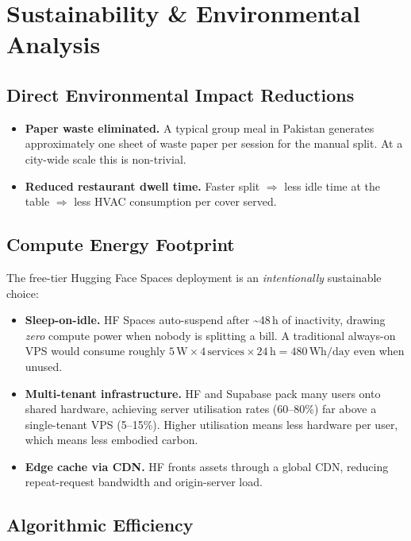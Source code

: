 \documentclass[11pt, a4paper]{article}
\begin{document}
\section{Sustainability \& Environmental Analysis}
\label{sec:sustain}

\subsection{Direct Environmental Impact Reductions}

\begin{itemize}[leftmargin=*]
\item \textbf{Paper waste eliminated.} A typical group meal in Pakistan generates approximately one sheet of waste paper per session for the manual split. At a city-wide scale this is non-trivial.
\item \textbf{Reduced restaurant dwell time.} Faster split $\Rightarrow$ less idle time at the table $\Rightarrow$ less HVAC consumption per cover served.
\end{itemize}

\subsection{Compute Energy Footprint}

The free-tier Hugging Face Spaces deployment is an \textit{intentionally} sustainable choice:

\begin{itemize}[leftmargin=*]
\item \textbf{Sleep-on-idle.} HF Spaces auto-suspend after \textasciitilde 48\,h of inactivity, drawing \textit{zero} compute power when nobody is splitting a bill. A traditional always-on VPS would consume roughly $5\,\text{W} \times 4\,\text{services} \times 24\,\text{h} = 480\,\text{Wh}/\text{day}$ even when unused.
\item \textbf{Multi-tenant infrastructure.} HF and Supabase pack many users onto shared hardware, achieving server utilisation rates (60--80\%) far above a single-tenant VPS (5--15\%). Higher utilisation means less hardware per user, which means less embodied carbon.
\item \textbf{Edge cache via CDN.} HF fronts assets through a global CDN, reducing repeat-request bandwidth and origin-server load.
\end{itemize}

\subsection{Algorithmic Efficiency}
\end{document}
